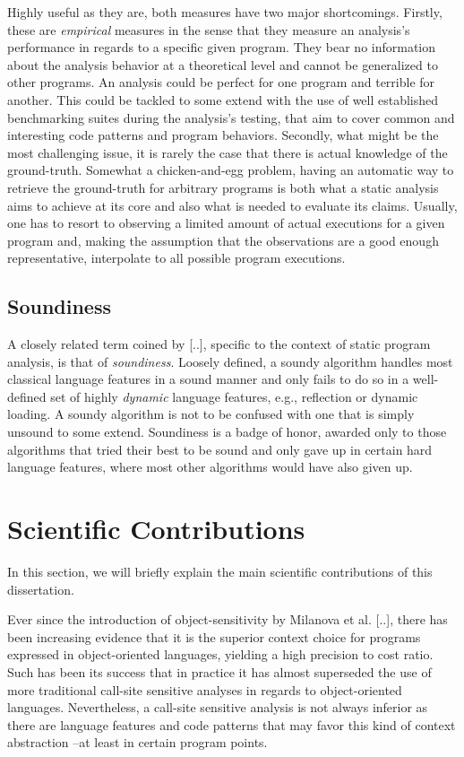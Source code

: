 Highly useful as they are, both measures have two major shortcomings. Firstly, these are \emph{empirical} measures in the sense that they measure an analysis's performance in regards to a specific given program. They bear no information about the analysis behavior at a theoretical level and cannot be generalized to other programs. An analysis could be perfect for one program and terrible for another. This could be tackled to some extend with the use of well established benchmarking suites during the analysis's testing, that aim to cover common and interesting code patterns and program behaviors. Secondly, what might be the most challenging issue, it is rarely the case that there is actual knowledge of the ground-truth. Somewhat a chicken-and-egg problem, having an automatic way to retrieve the ground-truth for arbitrary programs is both what a static analysis aims to achieve at its core and also what is needed to evaluate its claims. Usually, one has to resort to observing a limited amount of actual executions for a given program and, making the assumption that the observations are a good enough representative, interpolate to all possible program executions.

\subsection{Soundiness}

A closely related term coined by [..], specific to the context of static program analysis, is that of \emph{soundiness}. Loosely defined, a soundy algorithm handles most classical language features in a sound manner and only fails to do so in a well-defined set of highly \emph{dynamic} language features, e.g., reflection or dynamic loading. A soundy algorithm is not to be confused with one that is simply unsound to some extend. Soundiness is a badge of honor, awarded only to those algorithms that tried their best to be sound and only gave up in certain hard language features, where most other algorithms would have also given up.
\color{black}


\section{Scientific Contributions}

In this section, we will briefly explain the main scientific contributions of this dissertation.

Ever since the introduction of object-sensitivity by Milanova et al. [..], there has been increasing evidence that it is the superior context choice for programs expressed in object-oriented languages, yielding a high precision to cost ratio. Such has been its success that in practice it has almost superseded the use of more traditional call-site sensitive analyses in regards to object-oriented languages. Nevertheless, a call-site sensitive analysis is not always inferior as there are language features and code patterns that may favor this kind of context abstraction --at least in certain program points.

